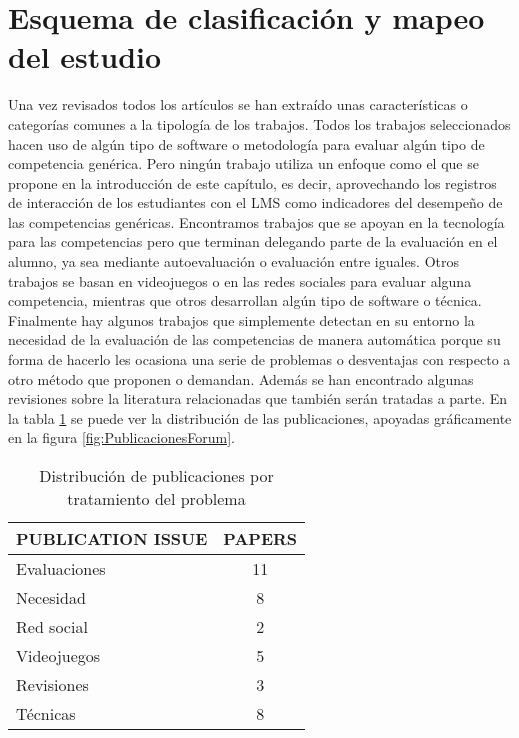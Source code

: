 \section{Esquema de clasificación y mapeo del estudio}

Una vez revisados todos los artículos se han extraído unas características o categorías comunes a la tipología de los trabajos. Todos los trabajos seleccionados hacen uso de algún tipo de software o metodología para evaluar algún tipo de competencia genérica. Pero ningún trabajo utiliza un enfoque como el que se propone en la introducción de este capítulo, es decir, aprovechando los registros de interacción de los estudiantes con el LMS como indicadores del desempeño de las competencias genéricas. Encontramos trabajos que se apoyan en la tecnología para las competencias pero que terminan delegando parte de la evaluación en el alumno, ya sea mediante autoevaluación o evaluación entre iguales. Otros trabajos se basan en videojuegos o en las redes sociales para evaluar alguna competencia, mientras que otros desarrollan algún tipo de software o técnica. Finalmente hay algunos trabajos que simplemente detectan en su entorno la necesidad de la evaluación de las competencias de manera automática porque su forma de hacerlo les ocasiona una serie de problemas o desventajas con respecto a otro método que proponen o demandan. Además se han encontrado algunas revisiones sobre la literatura relacionadas que también serán tratadas a parte.  En la tabla \ref{tab:PublicacionesForum} se puede ver la distribución de las publicaciones, apoyadas gráficamente en la figura  \ref{fig:PublicacionesForum}.

\begin{table}[H]
  \begin{center}
  \begin{tabular}{| m{4cm} | c |}
    \hline
    PUBLICATION ISSUE & PAPERS\\
    \hline
    \hline 
    Evaluaciones & 11\\
    \hline
    Necesidad & 8\\
    \hline
    Red social & 2\\
    \hline
    Videojuegos & 5\\
    \hline
    Revisiones & 3\\
    \hline
    Técnicas & 8 \\
    \hline
  \end{tabular}
\end{center}
\caption{Distribución de publicaciones por tratamiento del problema}
\label{tab:PublicacionesForum}
\end{table} 

